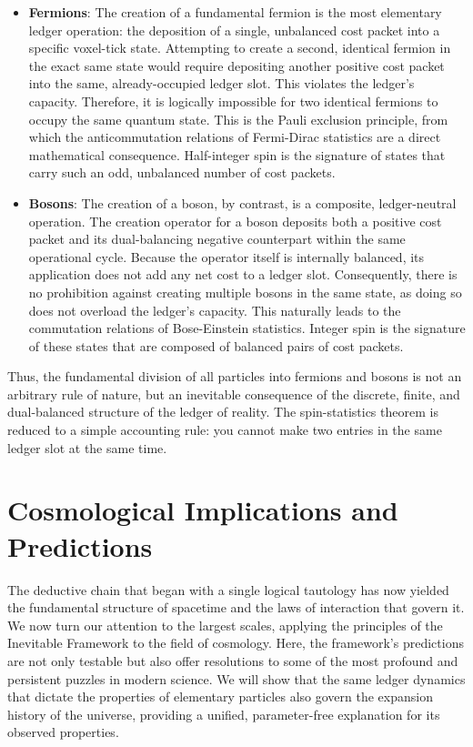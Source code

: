 \documentclass[11pt,a4paper]{article}
\begin{document}
\begin{itemize}
    \item \textbf{Fermions}: The creation of a fundamental fermion is the most elementary ledger operation: the deposition of a single, unbalanced cost packet into a specific voxel-tick state. Attempting to create a second, identical fermion in the exact same state would require depositing another positive cost packet into the same, already-occupied ledger slot. This violates the ledger's capacity. Therefore, it is logically impossible for two identical fermions to occupy the same quantum state. This is the Pauli exclusion principle, from which the anticommutation relations of Fermi-Dirac statistics are a direct mathematical consequence. Half-integer spin is the signature of states that carry such an odd, unbalanced number of cost packets.

    \item \textbf{Bosons}: The creation of a boson, by contrast, is a composite, ledger-neutral operation. The creation operator for a boson deposits both a positive cost packet and its dual-balancing negative counterpart within the same operational cycle. Because the operator itself is internally balanced, its application does not add any net cost to a ledger slot. Consequently, there is no prohibition against creating multiple bosons in the same state, as doing so does not overload the ledger's capacity. This naturally leads to the commutation relations of Bose-Einstein statistics. Integer spin is the signature of these states that are composed of balanced pairs of cost packets.
\end{itemize}

Thus, the fundamental division of all particles into fermions and bosons is not an arbitrary rule of nature, but an inevitable consequence of the discrete, finite, and dual-balanced structure of the ledger of reality. The spin-statistics theorem is reduced to a simple accounting rule: you cannot make two entries in the same ledger slot at the same time.

\section{Cosmological Implications and Predictions}

The deductive chain that began with a single logical tautology has now yielded the fundamental structure of spacetime and the laws of interaction that govern it. We now turn our attention to the largest scales, applying the principles of the Inevitable Framework to the field of cosmology. Here, the framework's predictions are not only testable but also offer resolutions to some of the most profound and persistent puzzles in modern science. We will show that the same ledger dynamics that dictate the properties of elementary particles also govern the expansion history of the universe, providing a unified, parameter-free explanation for its observed properties.
\end{document}
